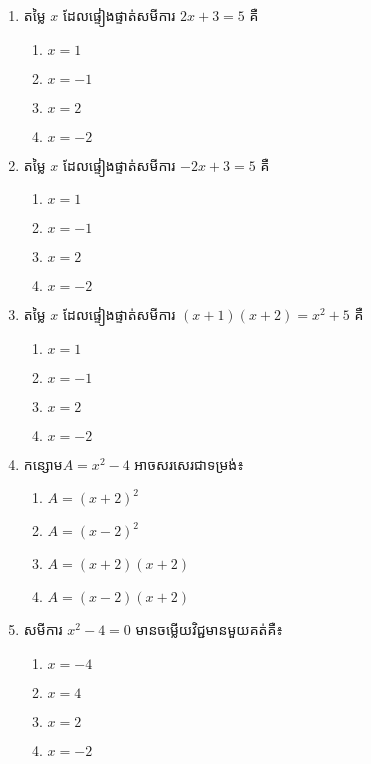\begin{enumerate}
\item តម្លៃ $x$ ដែលផ្ទៀងផ្ទាត់សមីការ $2x+3=5$ គឺ
\begin{multicols}{4}
\begin{enumerate}[label=\alph*.]
	\item $x=1$
	\item $x=-1$
	\item $x=2$
	\item $x=-2$
\end{enumerate}
\end{multicols}
\item តម្លៃ $x$ ដែលផ្ទៀងផ្ទាត់សមីការ $-2x+3=5$ គឺ
\begin{multicols}{4}
\begin{enumerate}[label=\alph*.]
	\item $x=1$
	\item $x=-1$
	\item $x=2$
	\item $x=-2$
\end{enumerate}
\end{multicols}
\item តម្លៃ $x$ ដែលផ្ទៀងផ្ទាត់សមីការ $(x+1)(x+2)=x^2+5$ គឺ
\begin{multicols}{4}
\begin{enumerate}[label=\alph*.]
	\item $x=1$
	\item $x=-1$
	\item $x=2$
	\item $x=-2$
\end{enumerate}
\end{multicols}
\item កន្សោម$A=x^2-4$ អាចសរសេរជាទម្រង់៖
\begin{multicols}{2}
\begin{enumerate}[label=\alph*.]
	\item $A=(x+2)^2$
	\item $A=(x-2)^2$
	\item $A=(x+2)(x+2)$
	\item $A=(x-2)(x+2)$
\end{enumerate}
\end{multicols}

\item សមីការ $x^2-4=0$ មានចម្លើយវិជ្ជមានមួយគត់គឺ៖
\begin{multicols}{4}
\begin{enumerate}[label=\alph*.]
	\item $x=-4$
	\item $x=4$
	\item $x=2$
	\item $x=-2$
\end{enumerate}
\end{multicols}



\end{enumerate}
